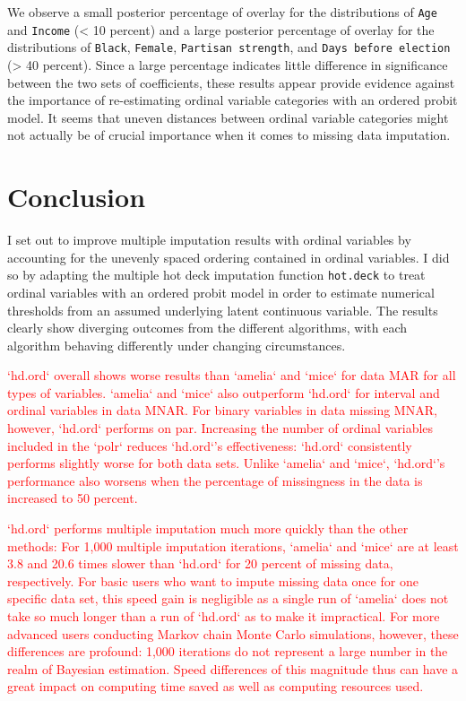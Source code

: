 \documentclass[12pt,econ]{sources/authesis}
\begin{document}
We observe a small posterior percentage of overlay for the distributions of \texttt{Age} and \texttt{Income} (\textless{} 10 percent) and a large posterior percentage of overlay for the distributions of \texttt{Black}, \texttt{Female}, \texttt{Partisan\ strength}, and \texttt{Days\ before\ election} (\textgreater{} 40 percent). Since a large percentage indicates little difference in significance between the two sets of coefficients, these results appear provide evidence against the importance of re-estimating ordinal variable categories with an ordered probit model. It seems that uneven distances between ordinal variable categories might not actually be of crucial importance when it comes to missing data imputation.

\hypertarget{ordmiss-conclusion}{%
\section{Conclusion}\label{ordmiss-conclusion}}

I set out to improve multiple imputation results with ordinal variables by accounting for the unevenly spaced ordering contained in ordinal variables. I did so by adapting the multiple hot deck imputation function \texttt{hot.deck} to treat ordinal variables with an ordered probit model in order to estimate numerical thresholds from an assumed underlying latent continuous variable. The results clearly show diverging outcomes from the different algorithms, with each algorithm behaving differently under changing circumstances.

\textcolor{red}{`hd.ord` overall shows worse results than `amelia` and `mice` for data MAR for all types of variables. `amelia` and `mice` also outperform `hd.ord` for interval and ordinal variables in data MNAR. For binary variables in data missing MNAR, however, `hd.ord` performs on par. Increasing the number of ordinal variables included in the `polr` reduces `hd.ord`'s effectiveness: `hd.ord` consistently performs slightly worse for both data sets. Unlike `amelia` and `mice`, `hd.ord`'s performance also worsens when the percentage of missingness in the data is increased to 50 percent.}

\textcolor{red}{`hd.ord` performs multiple imputation much more quickly than the other methods: For 1,000 multiple imputation iterations, `amelia` and `mice` are at least 3.8 and 20.6 times slower than `hd.ord` for 20 percent of missing data, respectively. For basic users who want to impute missing data once for one specific data set, this speed gain is negligible as a single run of `amelia` does not take so much longer than a run of `hd.ord` as to make it impractical. For more advanced users conducting Markov chain Monte Carlo simulations, however, these differences are profound: 1,000 iterations do not represent a large number in the realm of Bayesian estimation. Speed differences of this magnitude thus can have a great impact on computing time saved as well as computing resources used.}
\end{document}
